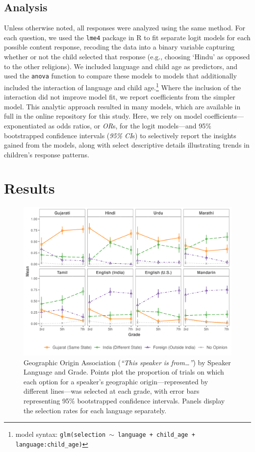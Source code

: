 \documentclass{foushee-adapted-preprint}
\begin{document}
\subsection*{Analysis}
Unless otherwise noted, all responses were analyzed using the same method. For each question, we used the \texttt{lme4} package in R to fit separate logit models for each possible content response, recoding the data into a binary variable capturing whether or not the child selected that response (e.g., choosing `Hindu' as opposed to the other religions). We included language and child age as predictors, and used the {\texttt{anova}} function to compare these models to models that additionally included the interaction of language and child age.\footnote{model syntax: \texttt{glm(selection $\sim$ language + child\_age + language:child\_age)}} 
Where the inclusion of the interaction did not improve model fit, we report coefficients from the simpler model. %
This analytic approach resulted in many models, which are available in full in the online repository for this study. 
Here, we rely on model coefficients---exponentiated as odds ratios, or \textit{OR}s, for the logit models---and 95\% bootstrapped confidence intervals (\textit{95\% CI}s) to selectively report the insights gained from the models, along with select descriptive details illustrating trends in children's response patterns. 
\section*{Results}
\begin{figure}
    \centering
    \includegraphics[width=1.2\linewidth]{figures/std_plots/geographic_origin_std.png}
    \caption{Geographic Origin Association (\emph{``This speaker is from\ldots''}) by Speaker Language and Grade. Points plot the proportion of trials on which each option for a speaker's geographic origin---represented by different lines---was selected at each grade, with error bars representing 95\% bootstrapped confidence intervals. Panels display the selection rates for each language separately.}
    \label{fig:geographic-origin}
\vspace{-7pt}
\end{figure}
\end{document}
